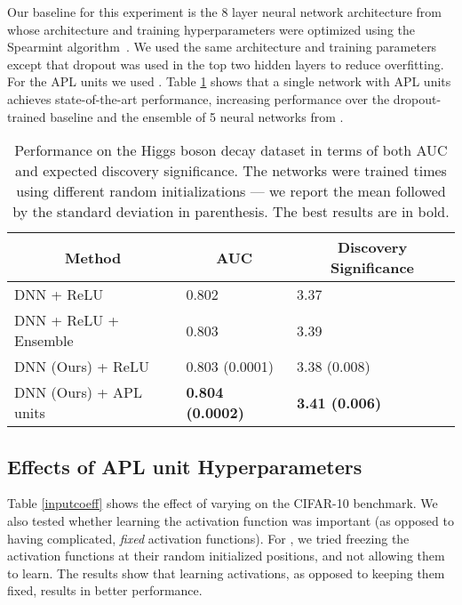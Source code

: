 \documentclass{article} \usepackage{iclr2015,times}
\begin{document}
Our baseline for this experiment is the 8 layer neural network architecture from \citep{baldi2014enhanced} whose architecture and training hyperparameters were optimized using the Spearmint algorithm~\citep{snoek2012practical}. We used the same architecture and training parameters except that dropout was used in the top two hidden layers to reduce overfitting. For the APL units we used . Table \ref{tab:higgsboson} shows that a single network with APL units achieves state-of-the-art performance, increasing performance over the dropout-trained baseline and the ensemble of 5 neural networks from \citep{baldi2014enhanced}. 

\begin{table}[h]
\caption{Performance on the Higgs boson decay dataset in terms of both AUC and expected discovery significance. The networks were trained  times using different random initializations --- we report the mean followed by the standard deviation in parenthesis. The best results are in bold.}
\label{tab:higgsboson}
\begin{center}
\begin{tabular}{lll}
\multicolumn{1}{c}{\bf Method}  &\multicolumn{1}{c}{\bf AUC} &\multicolumn{1}{c}{\bf Discovery Significance}\\
\hline
DNN + ReLU \citep{baldi2014enhanced} & 0.802 & 3.37 \\
DNN + ReLU + Ensemble\citep{baldi2014enhanced} & 0.803 & 3.39 \\
DNN (Ours) + ReLU & 0.803 (0.0001) & 3.38 (0.008)   \\
DNN (Ours) + APL units & \bf0.804 (0.0002) & \bf3.41 (0.006)    \\
\hline
\end{tabular}
\end{center}
\end{table}

\subsection{Effects of APL unit Hyperparameters}
\label{sec:hyperparams}
Table \ref{inputcoeff} shows the effect of varying  on the CIFAR-10 benchmark. We also tested whether learning the activation function was important (as opposed to having complicated, \emph{fixed} activation functions). For , we tried freezing the activation functions at their random initialized positions, and not allowing them to learn. The results show that learning activations, as opposed to keeping them fixed, results in better performance.
\end{document}

